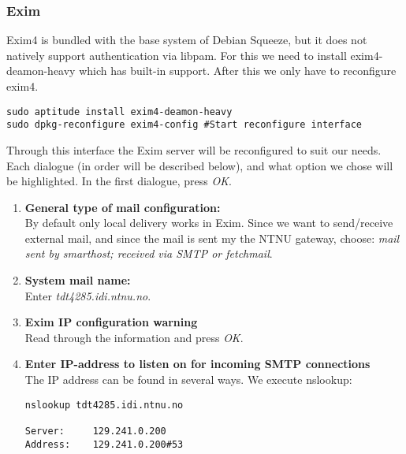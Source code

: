 \subsubsection{Exim}
Exim4 is bundled with the base system of Debian Squeeze, but it does not
natively support authentication via libpam. For this we need to install
exim4-deamon-heavy which has built-in support. After this we only have to
reconfigure exim4.
\begin{lstlisting}
sudo aptitude install exim4-deamon-heavy
sudo dpkg-reconfigure exim4-config #Start reconfigure interface
\end{lstlisting}
Through this interface the Exim server will be reconfigured to suit our
needs. Each dialogue (in order will be described below), and what option
we chose will be highlighted. In the first dialogue, press
\emph{OK}.
\begin{enumerate}
\item\textbf{General type of mail configuration:}\\
By default only local delivery works in Exim. Since we want to
send/receive external mail, and since the mail is sent my the NTNU
gateway, choose: \emph{mail sent by smarthost; received via SMTP or
fetchmail}.
\item\textbf{System mail name:}\\
Enter \emph{tdt4285.idi.ntnu.no}.
\item\textbf{Exim IP configuration warning}\\
Read through the information and press \emph{OK}.
\item\textbf{Enter IP-address to listen on for incoming SMTP
connections}\\
The IP address can be found in several ways. We execute nslookup:
\begin{lstlisting}
nslookup tdt4285.idi.ntnu.no

Server:		129.241.0.200
Address:	129.241.0.200#53


\end{lstlisting}
\end{enumerate}

